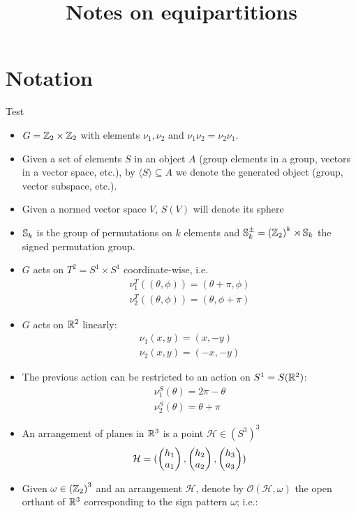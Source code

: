 \documentclass[10pt]{article}
\title{Notes on equipartitions}
\author{}
\begin{document}
\maketitle
\graphicspath{{./figs/}}

\section{Notation}
Test
\begin{itemize}
\item $G=\mathbb{Z}_2\times\mathbb{Z}_2$ with elements $\nu_1, \nu_2$ and $\nu_1\nu_2 = \nu_2\nu_1$.
  \item Given a set of elements $S$ in an object $A$ (group elements in a group, vectors in a vector space, etc.), by $\langle S\rangle\subseteq A$ we denote the generated object (group, vector subspace, etc.).
	\item Given a normed vector space $V$, $S(V)$ will denote its sphere
	\item $\mathbb{S}_k$ is the group of permutations on $k$ elements and $\mathbb{S}_k^{\pm} = \left( \mathbb{Z}_2 \right)^k \rtimes \mathbb{S}_k$ the signed permutation group.
	\item $G$ acts on $T^2 = S^1\times S^1$ coordinate-wise, i.e.
	\begin{align*}
		\nu_1^T((\theta, \phi)) = (\theta + \pi, \phi) \\
		\nu_2^T((\theta, \phi)) = (\theta, \phi + \pi)
	\end{align*}
	\item $G$ acts on $\mathbb{R}^2$ linearly:
	\begin{align*}
		\nu_1(x,y) = (x, -y)\\
		\nu_2(x,y) = (-x, -y)
	\end{align*}
	\item The previous action can be restricted to an action on $S^1=S(\mathbb{R}^2)$:
	\begin{align*}
		\nu_1^S(\theta) = 2\pi - \theta \\
		\nu_2^S(\theta) = \theta + \pi
	\end{align*}
	\item An arrangement of planes in $\mathbb{R}^3$ is a point $\mathcal{H} \in \left(S^3\right)^3$
	\[
		\mathcal{H}=(\begin{pmatrix}h_1\\a_1\end{pmatrix},\begin{pmatrix}h_2\\a_2\end{pmatrix}, \begin{pmatrix}h_3\\a_3\end{pmatrix})
	\]
	\item Given $\omega \in \left(\mathbb{Z}_2\right)^3$ and an arrangement $\mathcal{H}$, denote by $\mathcal{O}(\mathcal{H}, \omega)$ the open orthant of $\mathbb{R}^3$ corresponding to the sign pattern $\omega$; i.e.:

\end{itemize}
\end{document}
